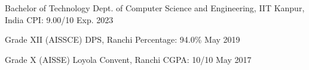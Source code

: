 

\begin{cvhonors}

  \cvhonor
    {Bachelor of Technology} %
    {Dept. of Computer Science and Engineering, IIT Kanpur, India} %
    {CPI: 9.00/10} %
    {Exp. 2023} %

  \cvhonor
    {Grade XII (AISSCE)} %
    {DPS, Ranchi} %
    {\hspace{-5em} Percentage: 94.0\%} %
    {May 2019} %

  \cvhonor
    {Grade X (AISSE)} %
    {Loyola Convent, Ranchi} %
    {CGPA: 10/10} %
    {May 2017} %


\end{cvhonors}